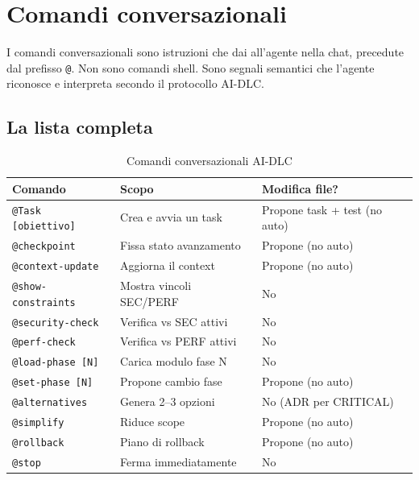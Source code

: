 ﻿%

\chapter{Comandi conversazionali}
\label{ch:comandi-conversazionali}

I comandi conversazionali sono istruzioni che dai all'agente nella chat, precedute dal prefisso \texttt{@}. Non sono comandi shell. Sono segnali semantici che l'agente riconosce e interpreta secondo il protocollo AI-DLC.

\section{La lista completa}
\label{sec:13-lista}

\begin{table}[htbp]
  \centering
  \begin{tabular}{lll}
    \toprule
    \textbf{Comando} & \textbf{Scopo} & \textbf{Modifica file?} \\
    \midrule
    \texttt{@Task [obiettivo]} & Crea e avvia un task & Propone task + test (no auto) \\
    \texttt{@checkpoint} & Fissa stato avanzamento & Propone (no auto) \\
    \texttt{@context-update} & Aggiorna il context & Propone (no auto) \\
    \texttt{@show-constraints} & Mostra vincoli SEC/PERF & No \\
    \texttt{@security-check} & Verifica vs SEC attivi & No \\
    \texttt{@perf-check} & Verifica vs PERF attivi & No \\
    \texttt{@load-phase [N]} & Carica modulo fase N & No \\
    \texttt{@set-phase [N]} & Propone cambio fase & Propone (no auto) \\
    \texttt{@alternatives} & Genera 2--3 opzioni & No (ADR per CRITICAL) \\
    \texttt{@simplify} & Riduce scope & Propone (no auto) \\
    \texttt{@rollback} & Piano di rollback & Propone (no auto) \\
    \texttt{@stop} & Ferma immediatamente & No \\
    \bottomrule
  \end{tabular}
  \caption{Comandi conversazionali AI-DLC}
  \label{tab:13-comandi}
\end{table}

